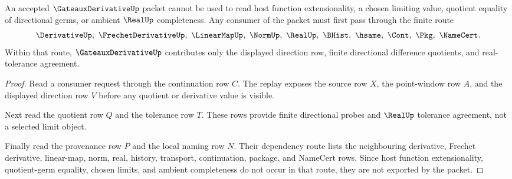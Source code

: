 \begin{theorem}
\label{thm:gateaux-derivative-local-nonescape}
An accepted $\GateauxDerivativeUp$ packet cannot be used to read host function extensionality, a chosen limiting value, quotient equality of directional germs, or ambient $\RealUp$ completeness. Any consumer of the packet must first pass through the finite route
$$
\DerivativeUp,\ \FrechetDerivativeUp,\ \LinearMapUp,\ \NormUp,\ \RealUp,\ \BHist,\ \hsame,\ \Cont,\ \Pkg,\ \NameCert .
$$
Within that route, $\GateauxDerivativeUp$ contributes only the displayed direction row, finite directional difference quotients, and real-tolerance agreement.
\end{theorem}
\begin{proof}
Read a consumer request through the continuation row $C$. The replay exposes the source row $X$, the point-window row $A$, and the displayed direction row $V$ before any quotient or derivative value is visible.

Next read the quotient row $Q$ and the tolerance row $T$. These rows provide finite directional probes and $\RealUp$ tolerance agreement, not a selected limit object.

Finally read the provenance row $P$ and the local naming row $N$. Their dependency route lists the neighbouring derivative, Frechet derivative, linear-map, norm, real, history, transport, continuation, package, and NameCert rows. Since host function extensionality, quotient-germ equality, chosen limits, and ambient completeness do not occur in that route, they are not exported by the packet.
\end{proof}




